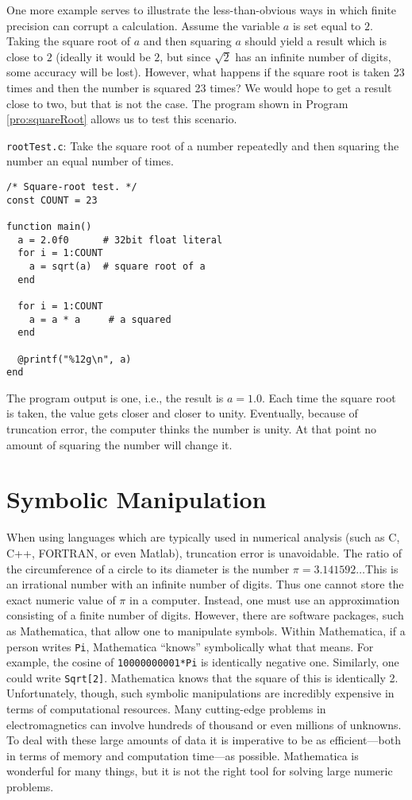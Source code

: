 One more example serves to illustrate the less-than-obvious ways in
which finite precision can corrupt a calculation.  Assume the variable
$a$ is set equal to $2$.  Taking the square root of $a$ and then
squaring $a$ should yield a result which is close to $2$ (ideally it
would be $2$, but since $\sqrt{2}$ has an infinite number of digits,
some accuracy will be lost).  However, what happens if the square root
is taken 23 times and then the number is squared 23 times?  We would
hope to get a result close to two, but that is not the case.
The program shown in Program \ref{pro:squareRoot} allows us to test
this scenario.
\begin{program}
{\tt rootTest.c}: 
Take the square root of a number repeatedly
and then squaring the number an equal number of
times. \label{pro:squareRoot}
\codemiddle
\begin{lstlisting}
/* Square-root test. */
const COUNT = 23

function main()
  a = 2.0f0      # 32bit float literal
  for i = 1:COUNT
    a = sqrt(a)  # square root of a
  end

  for i = 1:COUNT
    a = a * a     # a squared
  end

  @printf("%12g\n", a)
end
\end{lstlisting}
\end{program}
The program output is one, i.e., the result is $a=1.0$.  Each time the
square root is taken, the value gets closer and closer to unity.
Eventually, because of truncation error, the computer thinks the
number is unity.  At that point no amount of squaring the number will
change it.

\section{Symbolic Manipulation}

When using languages which are typically used in numerical analysis
(such as C, C++, FORTRAN, or even Matlab), truncation error is
unavoidable.  The ratio of the circumference of a circle to its
diameter is the number $\pi=3.141592\ldots$\@ This is an irrational
number with an infinite number of digits.  Thus one cannot store the
exact numeric value of $\pi$ in a computer.  Instead, one must use an
approximation consisting of a finite number of digits.  However, there
are software packages, such as Mathematica, that allow one to
manipulate symbols.  Within Mathematica, if a person writes {\tt Pi},
Mathematica ``knows'' symbolically what that means.  For example, the
cosine of {\tt 10000000001*Pi} is identically negative one.
Similarly, one could write {\tt Sqrt[2]}.  Mathematica knows that the
square of this is identically 2.  Unfortunately, though, such symbolic
manipulations are incredibly expensive in terms of computational
resources.  Many cutting-edge problems in electromagnetics can involve
hundreds of thousand or even millions of unknowns.  To deal with these
large amounts of data it is imperative to be as efficient---both in
terms of memory and computation time---as possible.  Mathematica is
wonderful for many things, but it is not the right tool for solving
large numeric problems.

